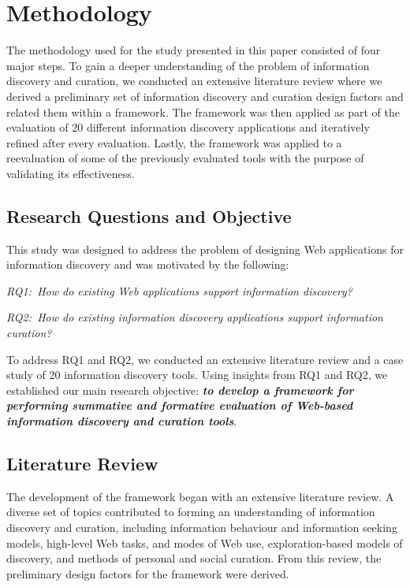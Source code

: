\documentclass{sigchi}
\begin{document}
\section{Methodology}
\label{section:methodology}
The methodology used for the study presented in this paper consisted of four major steps. To gain a deeper understanding of the problem of information discovery and curation, we conducted an extensive literature review where we derived a preliminary set of information discovery and curation design factors and related them within a framework. The framework was then applied as part of the evaluation of 20 different information discovery applications and iteratively refined after every evaluation. Lastly, the framework was applied to a reevaluation of some of the previously evaluated tools with the purpose of validating its effectiveness. 

{\subsection{Research Questions and Objective}
This study was designed to address the problem of designing Web applications for information discovery and was motivated by the following:

\emph{RQ1:~How do existing Web applications support information discovery?}

\emph{RQ2:~How do existing information discovery applications support information curation?}

To address RQ1 and RQ2, we conducted an extensive literature review and a case study of 20 information discovery tools. Using insights from RQ1 and RQ2, we established our main research objective: \emph{\textbf{to develop a framework for performing summative and formative evaluation of Web-based information discovery and curation tools}}.

}%

{\subsection{Literature Review}
\label{subsection:lit_review}
The development of the framework began with an extensive literature review. A diverse set of topics contributed to forming an understanding of information discovery and curation, including information behaviour and information seeking models, high-level Web tasks, and modes of Web use, exploration-based models of discovery, and methods of personal and social curation. From this review, the preliminary design factors for the framework were derived.
}%
\end{document}
